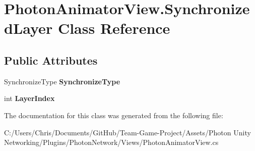 \hypertarget{class_photon_animator_view_1_1_synchronized_layer}{}\section{Photon\+Animator\+View.\+Synchronized\+Layer Class Reference}
\label{class_photon_animator_view_1_1_synchronized_layer}
\subsection*{Public Attributes}
\begin{DoxyCompactItemize}
\item 
Synchronize\+Type {\bfseries Synchronize\+Type}\hypertarget{class_photon_animator_view_1_1_synchronized_layer_a68d11cfd6780c4237bda70ee5f92a72c}{}\label{class_photon_animator_view_1_1_synchronized_layer_a68d11cfd6780c4237bda70ee5f92a72c}

\item 
int {\bfseries Layer\+Index}\hypertarget{class_photon_animator_view_1_1_synchronized_layer_ad1d491c302d7fbdf8f423c66561602b4}{}\label{class_photon_animator_view_1_1_synchronized_layer_ad1d491c302d7fbdf8f423c66561602b4}

\end{DoxyCompactItemize}


The documentation for this class was generated from the following file\+:\begin{DoxyCompactItemize}
\item 
C\+:/\+Users/\+Chris/\+Documents/\+Git\+Hub/\+Team-\/\+Game-\/\+Project/\+Assets/\+Photon Unity Networking/\+Plugins/\+Photon\+Network/\+Views/Photon\+Animator\+View.\+cs\end{DoxyCompactItemize}
